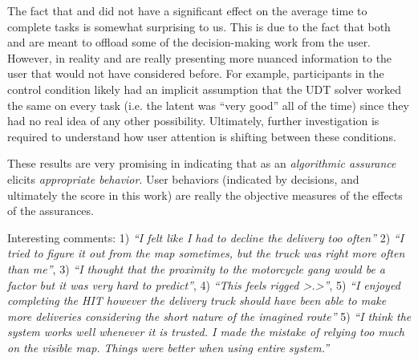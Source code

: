 The fact that \xQ{} and \xO{} did not have a significant effect on the average time to complete tasks is somewhat surprising to us. This is due to the fact that both \xQ{} and \xO{} are meant to offload some of the decision-making work from the user. However, in reality \xQ{} and \xO{} are really presenting more nuanced information to the user that would not have considered before. For example, participants in the control condition likely had an implicit assumption that the UDT solver worked the same on every task (i.e. the latent \xQ{} was ``very good'' all of the time) since they had no real idea of any other possibility. Ultimately, further investigation is required to understand how user attention is shifting between these conditions.

These results are very promising in indicating that \famsec{} as an \emph{algorithmic assurance} elicits \emph{appropriate behavior}. User behaviors (indicated by decisions, and ultimately the score in this work) are really the objective measures of the effects of the assurances.

Interesting comments: 1) \emph{``I felt like I had to decline the delivery too often''} 2) \emph{``I tried to figure it out from the map sometimes, but the truck was right more often than me''}, 3) \emph{``I thought that the proximity to the motorcycle gang would be a factor but it was very hard to predict''}, 4) \emph{``This feels rigged >.>''}, 5) \emph{``I enjoyed completing the HIT however the delivery truck should have been able to make more deliveries considering the short nature of the imagined route''} 5) \emph{``I think the system works well whenever it is trusted. I made the mistake of relying too much on the visible map. Things were better when using entire system.''}
